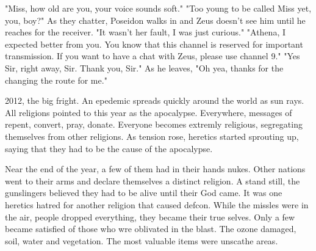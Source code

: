 		"Miss, how old are you, your voice sounds soft." "Too young to be called Miss yet, you, boy?" As they chatter, Poseidon walks in and Zeus doesn't see
	him until he reaches for the receiver. "It wasn't her fault, I was just curious." "Athena, I expected better from you. You know that this channel is reserved
	for important transmission. If you want to have a chat with Zeus, please use channel 9." "Yes Sir, right away, Sir. Thank you, Sir." As he leaves, "Oh yea,
	thanks for the changing the route for me."

		2012, the big fright. An epedemic spreads quickly around the world as sun rays. All religions pointed to this year as the apocalypse. Everywhere,
	messages of repent, convert, pray, donate. Everyone becomes extremly religious, segregating themselves from other religions. As tension rose, heretics started
	sprouting up, saying that they had to be the cause of the apocalypse.

		Near the end of the year, a few of them had in their hands nukes. Other nations went to their arms and declare themselves a distinct religion. A stand
	still, the gunslingers believed they had to be alive until their God came. It was one heretics hatred for another religion that caused defcon. While the 
	missles were in the air, people dropped everything, they became their true selves. Only a few became satisfied of those who wre oblivated in the blast. The
	ozone damaged, soil, water and vegetation. The most valuable items were unscathe areas.
